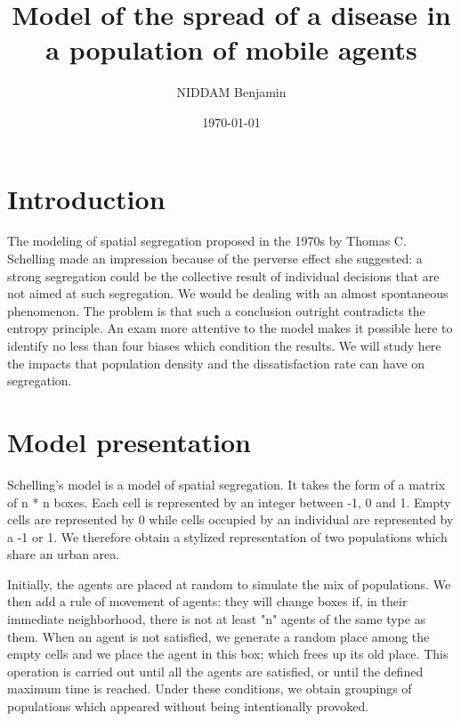 \documentclass[a4paper, 12pt]{report}
\title{Model of the spread of a disease in a population of mobile agents}
\author{NIDDAM Benjamin}
\date{\today}
\begin{document}
\begin{titlepage}
	\maketitle
\end{titlepage}

\newpage

\tableofcontents

\newpage
\section{Introduction}
The modeling of spatial segregation proposed in the 1970s by Thomas
C. Schelling made an impression because of the perverse effect she suggested: a strong
segregation could be the collective result of individual decisions that are not aimed at
such segregation. We would be dealing with an almost spontaneous phenomenon. The problem is
that such a conclusion outright contradicts the entropy principle. An exam
more attentive to the model makes it possible here to identify no less than four biases which condition the
results. We will study here the impacts that population density and the dissatisfaction rate can have on segregation.

\section{Model presentation}

Schelling's model is a model of spatial segregation. It takes the form of a matrix of n * n boxes.
Each cell is represented by an integer between -1, 0 and 1. Empty cells are represented by 0 while cells
occupied by an individual are represented by a -1 or 1. We therefore obtain a stylized representation of two populations which
share an urban area.

Initially, the agents are placed at random to simulate the mix of populations. We then add a rule of
movement of agents: they will change boxes if, in their immediate neighborhood, there is not at least "n"
agents of the same type as them. When an agent is not satisfied, we generate a random place among the empty cells and we
place the agent in this box; which frees up its old place. This operation is carried out until all the agents
are satisfied, or until the defined maximum time is reached. Under these conditions, we obtain groupings of
populations which appeared without being intentionally provoked.

\newpage
\end{document}
